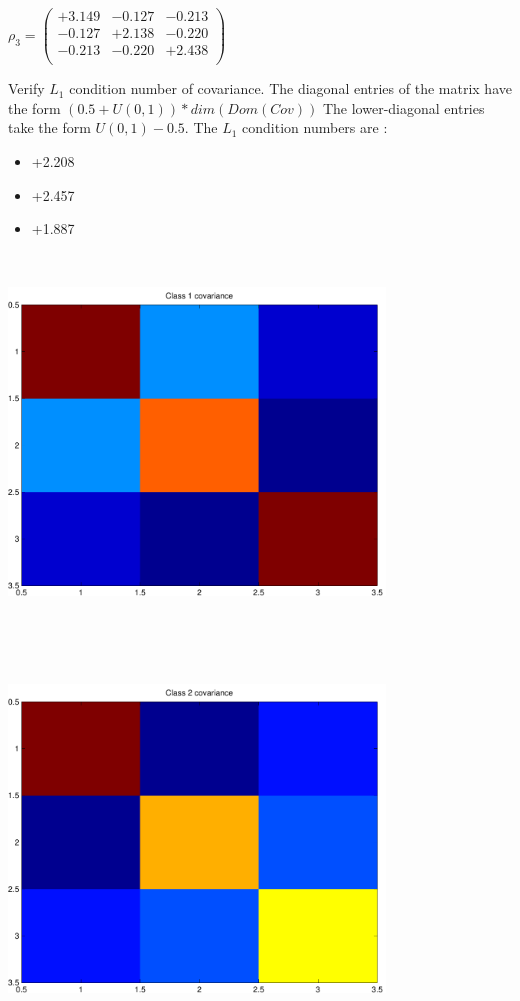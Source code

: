 \documentclass[9pt]{article}
\theoremstyle{plain}
\theoremstyle{definition}
\theoremstyle{remark}
\numberwithin{equation}{section}
\begin{document}
$\rho_3 = \left(
\begin{array}{
ccc}
+3.149 & -0.127 & -0.213 \\
-0.127 & +2.138 & -0.220 \\
-0.213 & -0.220 & +2.438 \\
\end{array}
\right)$ \newline 

Verify $L_1$ condition number of covariance. The diagonal entries of the matrix have the form $(0.5 + U(0,1) )*dim(Dom(Cov))$
The lower-diagonal entries take the form $U(0,1) - 0.5$. 
The $L_1$ condition numbers are :
\begin{itemize}
\item +2.208
\item +2.457
\item +1.887
\end{itemize}
\includegraphics[width=10.0cm,height=10.0cm]{rv1_corr.pdf}

\includegraphics[width=10.0cm,height=10.0cm]{rv2_corr.pdf}
\end{document}
